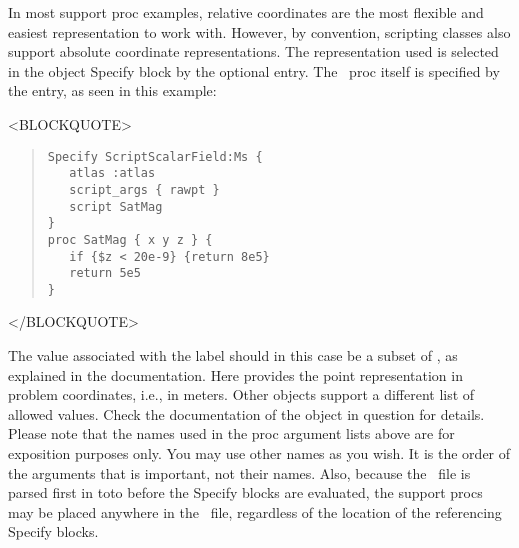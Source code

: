 In most support proc examples, relative coordinates are the most
flexible and easiest representation to work with.  However, by
convention, scripting  classes also support absolute
coordinate representations.  The representation used is selected in the
 object Specify block by the optional 
entry.  The \Tcl\ proc itself is specified by the  entry,
as seen in this example:
\begin{rawhtml}<BLOCKQUOTE>\end{rawhtml}
\begin{quote}
\begin{verbatim}
Specify ScriptScalarField:Ms {
   atlas :atlas
   script_args { rawpt }
   script SatMag
}
proc SatMag { x y z } {
   if {$z < 20e-9} {return 8e5}
   return 5e5
}
\end{verbatim}
\end{quote}
\begin{rawhtml}</BLOCKQUOTE>\end{rawhtml}
The value associated with the label  should in this
case be a subset of , as explained in the
documentation.  Here
 provides the point representation in problem coordinates,
i.e., in meters.  Other  objects support a different list of
allowed  values.  Check the documentation of the
 object in question for details.  Please note that the
names used in the proc argument lists above are for exposition purposes
only.  You may use other names as you wish.  It is the order of the
arguments that is important, not their names.  Also, because the \MIF\
file is parsed first in toto before the Specify blocks are evaluated,
the support procs may be placed anywhere in the \MIF\ file, regardless
of the location of the referencing Specify blocks.

